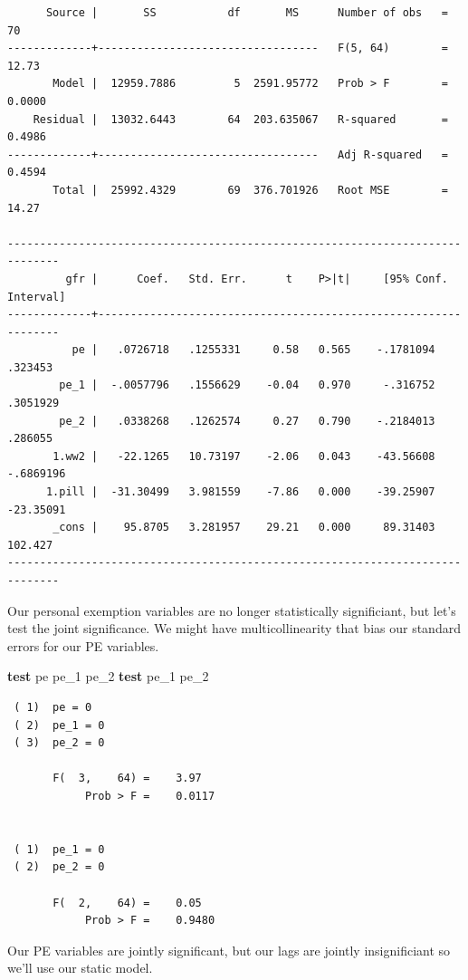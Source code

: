 \documentclass[
]{book}
\newenvironment{Shaded}{\begin{snugshade}}{\end{snugshade}}
\newcommand{\KeywordTok}[1]{\textcolor[rgb]{0.13,0.29,0.53}{\textbf{#1}}}
\newcommand{\NormalTok}[1]{#1}
\begin{document}
\begin{verbatim}
      Source |       SS           df       MS      Number of obs   =        70
-------------+----------------------------------   F(5, 64)        =     12.73
       Model |  12959.7886         5  2591.95772   Prob > F        =    0.0000
    Residual |  13032.6443        64  203.635067   R-squared       =    0.4986
-------------+----------------------------------   Adj R-squared   =    0.4594
       Total |  25992.4329        69  376.701926   Root MSE        =     14.27

------------------------------------------------------------------------------
         gfr |      Coef.   Std. Err.      t    P>|t|     [95% Conf. Interval]
-------------+----------------------------------------------------------------
          pe |   .0726718   .1255331     0.58   0.565    -.1781094     .323453
        pe_1 |  -.0057796   .1556629    -0.04   0.970     -.316752    .3051929
        pe_2 |   .0338268   .1262574     0.27   0.790    -.2184013     .286055
       1.ww2 |   -22.1265   10.73197    -2.06   0.043    -43.56608   -.6869196
      1.pill |  -31.30499   3.981559    -7.86   0.000    -39.25907   -23.35091
       _cons |    95.8705   3.281957    29.21   0.000     89.31403     102.427
------------------------------------------------------------------------------
\end{verbatim}

Our personal exemption variables are no longer statistically significiant, but
let's test the joint significance. We might have multicollinearity that bias
our standard errors for our PE variables.

\begin{Shaded}
\begin{Highlighting}[]
\KeywordTok{test}\NormalTok{ pe pe\_1 pe\_2}
\KeywordTok{test}\NormalTok{ pe\_1 pe\_2}
\end{Highlighting}
\end{Shaded}

\begin{verbatim}
 ( 1)  pe = 0
 ( 2)  pe_1 = 0
 ( 3)  pe_2 = 0

       F(  3,    64) =    3.97
            Prob > F =    0.0117


 ( 1)  pe_1 = 0
 ( 2)  pe_2 = 0

       F(  2,    64) =    0.05
            Prob > F =    0.9480
\end{verbatim}

Our PE variables are jointly significant, but our lags are jointly insignificiant
so we'll use our static model.
\end{document}
